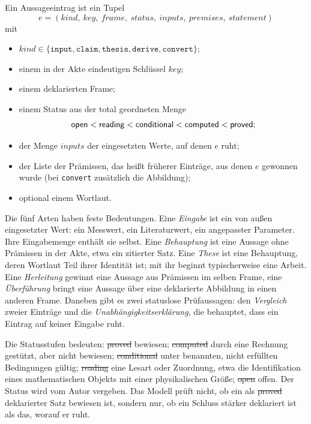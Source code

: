 \begin{definition}[Eintrag]\label{def:eintrag}
Ein Aussageeintrag ist ein Tupel
\[
e=(\mathit{kind},\ \mathit{key},\ \mathit{frame},\ \mathit{status},\ \mathit{inputs},\ \mathit{premises},\ \mathit{statement})
\]
mit
\begin{itemize}[nosep]
\item \(\mathit{kind}\in\{\texttt{input},\texttt{claim},\texttt{thesis},\texttt{derive},\texttt{convert}\}\);
\item einem in der Akte eindeutigen Schlüssel \(\mathit{key}\);
\item einem deklarierten Frame;
\item einem Status aus der total geordneten Menge
\[
\textsf{open}<\textsf{reading}<\textsf{conditional}<\textsf{computed}<\textsf{proved};
\]
\item der Menge \(\mathit{inputs}\) der eingesetzten Werte, auf denen \(e\) ruht;
\item der Liste der Prämissen, das heißt früherer Einträge, aus denen \(e\) gewonnen wurde (bei \texttt{convert} zusätzlich die Abbildung);
\item optional einem Wortlaut.
\end{itemize}
\end{definition}

Die fünf Arten haben feste Bedeutungen. Eine \emph{Eingabe} ist ein von außen eingesetzter Wert: ein Messwert, ein Literaturwert, ein
angepasster Parameter. Ihre Eingabemenge enthält sie selbst. Eine \emph{Behauptung} ist eine Aussage ohne Prämissen in der Akte, etwa ein
zitierter Satz. Eine \emph{These} ist eine Behauptung, deren Wortlaut Teil ihrer Identität ist; mit ihr beginnt typischerweise eine Arbeit.
Eine \emph{Herleitung} gewinnt eine Aussage aus Prämissen im selben Frame, eine \emph{Überführung} bringt eine Aussage über eine
deklarierte Abbildung in einen anderen Frame. Daneben gibt es zwei statuslose Prüfaussagen: den \emph{Vergleich} zweier Einträge und die
\emph{Unabhängigkeitserklärung}, die behauptet, dass ein Eintrag auf keiner Eingabe ruht.

Die Statusstufen bedeuten: \st{proved} bewiesen; \st{computed} durch eine Rechnung gestützt, aber nicht bewiesen; \st{conditional} unter
benannten, nicht erfüllten Bedingungen gültig; \st{reading} eine Lesart oder Zuordnung, etwa die Identifikation eines mathematischen
Objekts mit einer physikalischen Größe; \st{open} offen. Der Status wird vom Autor vergeben. Das Modell prüft nicht, ob ein als
\st{proved} deklarierter Satz bewiesen ist, sondern nur, ob ein Schluss stärker deklariert ist als das, worauf er ruht.

